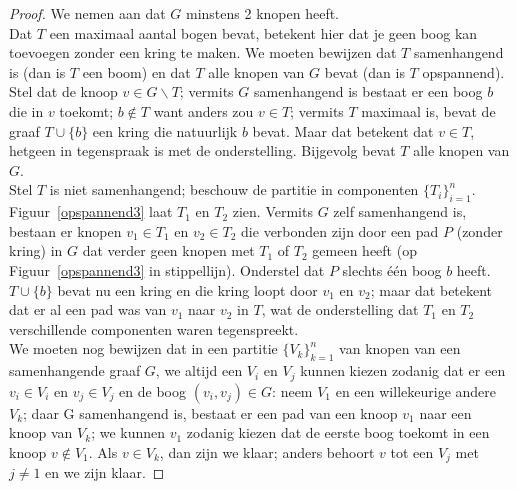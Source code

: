 \begin{proof}
We nemen aan dat $G$ minstens 2 knopen heeft.\\
Dat $T$ een maximaal aantal bogen bevat, betekent hier dat je geen boog kan
toevoegen zonder een kring te maken. We moeten bewijzen dat $T$
samenhangend is (dan is $T$ een boom) en dat $T$ alle knopen van $G$ bevat
(dan is $T$ opspannend).\\
Stel dat de knoop $v \in G \backslash T$; vermits $G$ samenhangend is 
bestaat er een boog $b$ die in $v$ toekomt; $b \notin T$ want anders zou
$v \in T$; vermits $T$ maximaal is, bevat de graaf $T \cup \{b\}$ 
een
kring die natuurlijk $b$ bevat. Maar dat betekent dat $v \in T$, hetgeen
in tegenspraak is met de onderstelling. Bijgevolg bevat $T$ alle knopen
van $G$.\\
Stel $T$ is niet samenhangend; beschouw de partitie in componenten
$\{T_{i}\}_{i=1}^{n}$. Figuur~\ref{opspannend3} laat $T_{1}$ en
$T_{2}$ zien. Vermits $G$ zelf samenhangend is, bestaan er knopen $v_{1}
\in T_{1}$ en $v_{2} \in T_{2}$ die verbonden zijn door een pad $P$
(zonder kring) in $G$ dat verder geen knopen met $T_{1}$ of $T_{2}$
gemeen heeft (op Figuur~\ref{opspannend3} in stippellijn). Onderstel
dat $P$ slechts \'{e}\'{e}n boog $b$ heeft. $T \cup \{b\}$ bevat nu een
kring en die kring loopt door $v_{1}$ en $v_{2}$; maar dat betekent
dat er al een pad was van $v_{1}$ naar $v_{2}$ in $T$, wat de
onderstelling dat $T_{1}$ en $T_{2}$ verschillende componenten waren
tegenspreekt.\\
We moeten nog bewijzen dat in een partitie $\{V_{k}\}_{k=1}^{n}$ van knopen
van een samenhangende graaf $G$, we altijd een $V_{i}$ en $V_{j}$ kunnen
kiezen zodanig dat er een $v_{i} \in V_{i}$ en $v_{j} \in V_{j}$ en de
boog $(v_{i},v_{j}) \in G$: neem $V_{1}$ en een willekeurige andere
$V_{k}$; daar G samenhangend is, bestaat er een pad van een knoop
$v_{1}$ naar een knoop van $V_{k}$; we kunnen $v_{1}$ zodanig kiezen
dat de eerste boog toekomt in een knoop $v \notin V_{1}$. Als $v \in
V_{k}$, dan zijn we klaar; anders behoort $v$ tot een $V_{j}$ met $j
\neq 1$ en we zijn klaar.
\end{proof}




